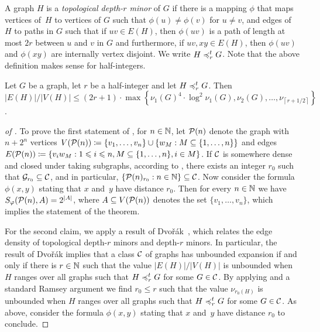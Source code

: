 A graph $H$ is a \emph{topological depth-$r$ minor} of $G$ if
there is a mapping $\phi$ that maps vertices of~$H$ to 
vertices of $G$ such that $\phi(u)\neq \phi(v)$ for 
$u\neq v$, and edges of $H$ to paths in 
$G$ such that if $uv\in E(H)$, then $\phi(uv)$
is a path of length at most $2r$ between $u$ and $v$ in 
$G$ and furthermore, if $uv, xy\in E(H)$, then 
$\phi(uv)$ and $\phi(xy)$ are internally vertex
disjoint. We write $H\preccurlyeq_r^t G$. 
Note that the above definition makes sense for 
half-integers. 

\begin{lemma}\label{lem:lower-be}
Let $G$ be a graph, let $r$ be a half-integer 
and let $H\preccurlyeq_r^tG$. 
Then $|E(H)|/|V(H)|\leq (2r + 1)\cdot \max \left\{\nu_1(G)^4\cdot \log^2\nu_1(G),\nu_2(G),\ldots, \nu_{\left\lceil r+1/2\right\rceil}\right\}$.
\end{lemma}

\begin{proof}[of ]
To prove the first statement of , 
for $n\in \mathbb{N}$, let $\mathcal{P}(n)$ denote the graph with $n+2^n$ 
vertices $V(\mathcal{P}(n))\coloneqq \{v_1,\ldots, v_n\}\cup \{w_M : M\subseteq \{1,\ldots, n\}\}$ and edges $E(\mathcal{P}(n))\coloneqq \{v_iw_M :1\leqslant i\leqslant n, M\subseteq \{1,\ldots, n\}, i\in M\}$. 
If $\mathcal{C}$ is somewhere dense and closed under taking subgraphs, 
according to , there exists an integer $r_0$ 
such that $\mathcal{G}_{r_0}\subseteq \mathcal{C}$, and in particular, 
$\{\mathcal{P}(n)_{r_0} :n\in \mathbb{N}\}\subseteq \mathcal{C}$. Now consider 
the formula $\phi(x,y)$ stating that $x$ and~$y$ have 
distance $r_0$. Then for every $n\in \mathbb{N}$ we have 
$S_\varphi(\mathcal{P}(n),A)=2^{|A|}$, where $A\subseteq V(\mathcal{P}(n))$ denotes the set $\{v_1,\ldots, v_n\}$, which implies the statement
of the theorem.

For the second claim, we apply a result of Dvo\v{r}\'ak~\cite{dvorak2007asymptotical}, 
which relates the edge density of topological depth-$r$ minors
and depth-$r$ minors. In particular, the result of Dvo\v{r}\'ak
implies that a 
class $\mathcal{C}$ of graphs has unbounded expansion if and only 
if there is $r\in \mathbb{N}$ such that the value $|E(H)|/|V(H)|$ is unbounded
when $H$ ranges over all graphs such that $H\preccurlyeq_r^tG $ for some $G\in \mathcal{C}$.
 By applying  and 
a standard Ramsey argument we find $r_0\leq r$ such that the value
$\nu_{r_0(H)}$ is unbounded when $H$ ranges over all graphs such that $H\preccurlyeq_r^t G$
for some $G\in\mathcal{C}$. As above, consider 
the formula $\phi(x,y)$ stating that $x$ and~$y$ have 
distance $r_0$ to conclude. 
\end{proof}


